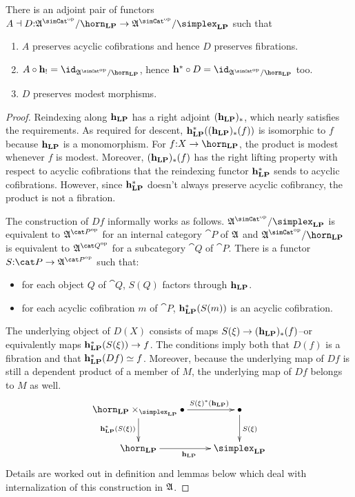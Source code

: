 \documentclass[csh.tex]{subfiles}
\begin{document}
\begin{lemma}
There is an adjoint pair of functors $A\dashv D\of \ambient\s/\horn_\LP \to \ambient\s/\simplex_\LP$ such that
\begin{enumerate}
\item $A$ preserves acyclic cofibrations and hence $D$ preserves fibrations.
\item $A\circ\foh_! = \id_{\ambient\s/\horn_\LP}$, hence $\foh^* \circ D = \id_{\ambient\s/\horn_\LP}$ too.
\item $D$ preserves modest morphisms.
\end{enumerate}
\label{descent}
\end{lemma}

\newcommand\dsum[1]{\Sigma_{#1}}
\begin{proof}




Reindexing along $\mathbf{h}_{\mathbf{LP}}$ has a right adjoint $(\mathbf{h}_{\mathbf{LP}})_*$, which nearly satisfies the requirements. As required for descent, $\mathbf{h}_{\mathbf{LP}}^*((\mathbf{h}_{\mathbf{LP}})_*(f))$ is isomorphic to $f$ because $\mathbf{h}_{\mathbf{LP}}$ is a monomorphism. For $f\of X\to \horn_\LP$, the product is modest whenever $f$ is modest. Moreover, $(\mathbf{h}_{\mathbf{LP}})_*(f)$ has the right lifting property with respect to acyclic cofibrations that the reindexing functor $\mathbf{h}_{\mathbf{LP}}^*$ sends to acyclic cofibrations. However, since $\mathbf{h}_{\mathbf{LP}}^*$ doesn't always preserve acyclic cofibrancy, the product is not a fibration.

The construction of $Df$ informally works as follows.
$\ambient\s/\simplex_\LP$ is equivalent to $\ambient^{\cat P\dual}$ for an internal category $\cat P$ of $\mathfrak A$ and $\ambient\s/\horn_\LP$ is equivalent to $\ambient^{\cat Q\dual}$ for a subcategory $\cat Q$ of $\cat P$. There is a functor $S\of\cat P\to \ambient^{\cat P\dual}$ such that: %
\begin{itemize}
\item for each object $Q$ of $\cat Q$, $S(Q)$ factors through $\mathbf{h}_{\mathbf{LP}}$.
\item for each acyclic cofibration $m$ of $\cat P$, $\mathbf{h}_{\mathbf{LP}}^*(S(m))$ is an acyclic cofibration.
\end{itemize}
The underlying object of $D(X)$ consists of maps $S(\xi)\to(\mathbf{h}_{\mathbf{LP}})_*(f)$--or equivalently maps $\mathbf{h}_{\mathbf{LP}}^*(S(\xi))\to f$. %
The conditions imply both that $D(f)$ is a fibration and that $\mathbf{h}_{\mathbf{LP}}^*(Df) \simeq f$. %
Moreover, because the underlying map of $Df$ is still a dependent product of a member of $M$, the underlying map of $Df$ belongs to $M$ as well. %
\[\xymatrix{
\horn_\LP\times_{\simplex_\LP}\bullet\ar[r]^(.7){S(\xi)\ri(\foh_\LP)}\ar[d]_{\foh_\LP\ri(S(\xi))} & \bullet\ar[d]^{S(\xi)}\\
\horn_\LP \ar[r]_{\foh_\LP} & \simplex_\LP
}\]
Details are worked out in definition and lemmas below which deal with internalization of this construction in $\mathfrak A$.
\end{proof}
\end{document}
